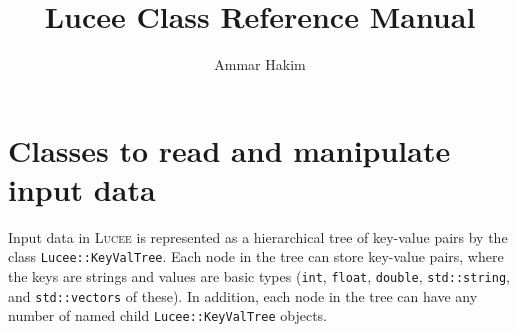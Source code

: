\documentclass[11pt]{article}
\title{Lucee Class Reference Manual}
\author{Ammar Hakim}
\date{}
\begin{document}
\maketitle

\section{Classes to read and manipulate input data}

Input data in \textsc{Lucee} is represented as a hierarchical tree of
key-value pairs by the class \verb=Lucee::KeyValTree=. Each node in
the tree can store key-value pairs, where the keys are strings and
values are basic types (\verb=int=, \verb=float=, \verb=double=,
\verb=std::string=, and \verb=std::vectors= of these). In addition,
each node in the tree can have any number of named child
\verb=Lucee::KeyValTree= objects.
\end{document}
